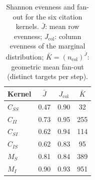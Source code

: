 \begin{table}[htbp]
\centering
\caption{Shannon evenness and fan-out for the six citation kernels.
  $\bar{J}$: mean row evenness; $J_{\text{col}}$: column evenness of the
  marginal distribution; $\bar{K} = (n_{\text{col}})^{\bar{J}}$: geometric
  mean fan-out (distinct targets per step).}
\label{tab:kernel_structure}
\begin{tabular}{lccc}
\toprule
Kernel & $\bar{J}$ & $J_{\text{col}}$ & $\bar{K}$ \\
\midrule
$C_{SS}$ & 0.47 & 0.90 & 32 \\
$C_{II}$ & 0.73 & 0.95 & 255 \\
$C_{SI}$ & 0.62 & 0.94 & 114 \\
$C_{IS}$ & 0.62 & 0.83 & 95 \\
\midrule
$M_S$ & 0.81 & 0.84 & 389 \\
\midrule
$M_I$ & 0.90 & 0.93 & 951 \\
\bottomrule
\end{tabular}
\end{table}

